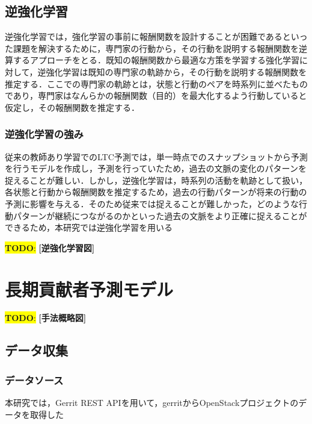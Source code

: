 \documentclass[submit,techrep,noauthor]{ipsj}
\newcommand{\todo}[1]{\colorbox{yellow}{{\bf TODO}:}{\color{red} {\textbf{[#1]}}}}
\begin{document}
\subsection{逆強化学習}
逆強化学習では，強化学習の事前に報酬関数を設計することが困難であるといった課題を解決するために，専門家の行動から，その行動を説明する報酬関数を逆算するアプローチをとる．既知の報酬関数から最適な方策を学習する強化学習に対して，逆強化学習は既知の専門家の軌跡から，その行動を説明する報酬関数を推定する．ここでの専門家の軌跡とは，状態と行動のペアを時系列に並べたものであり，専門家はなんらかの報酬関数（目的）を最大化するよう行動していると仮定し，その報酬関数を推定する．
\subsubsection{逆強化学習の強み}
従来の教師あり学習でのLTC予測では，単一時点でのスナップショットから予測を行うモデルを作成し，予測を行っていたため，過去の文脈の変化のパターンを捉えることが難しい．しかし，逆強化学習は，時系列の活動を軌跡として扱い，各状態と行動から報酬関数を推定するため，過去の行動パターンが将来の行動の予測に影響を与える．そのため従来では捉えることが難しかった，どのような行動パターンが継続につながるのかといった過去の文脈をより正確に捉えることができるため，本研究では逆強化学習を用いる

\todo{逆強化学習図}


\label{sec:format}
\section{長期貢献者予測モデル}
\label{config}
\todo{手法概略図}

\subsection{データ収集}
\subsubsection{データソース}
本研究では，Gerrit REST APIを用いて，gerritからOpenStackプロジェクトのデータを取得した
\end{document}
